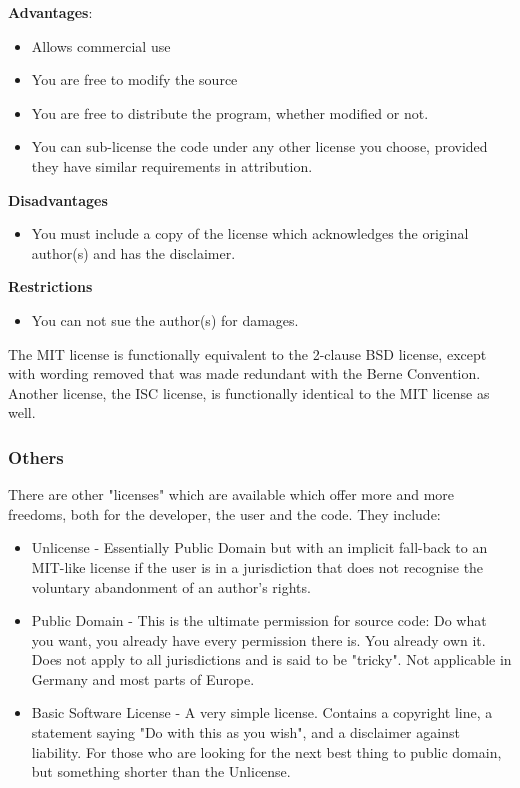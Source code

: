 \textbf{Advantages}:
\begin{itemize}
\item Allows commercial use
\item You are free to modify the source
\item You are free to distribute the program, whether modified or not.
\item You can sub-license the code under any other license you choose, provided they have similar requirements in attribution.
\end{itemize}
\textbf{Disadvantages}
\begin{itemize}
\item You must include a copy of the license which acknowledges the original author(s) and has the disclaimer.
\end{itemize}
\textbf{Restrictions}
\begin{itemize}
\item You can not sue the author(s) for damages.
\end{itemize}
The MIT license is functionally equivalent to the 2-clause BSD license, except with wording removed that was made redundant with the Berne Convention. Another license, the ISC license, is functionally identical to the MIT license as well.

\subsubsection{Others}
There are other "licenses" which are available which offer more and more freedoms, both for the developer, the user and the code. They include:
\begin{itemize}
\item Unlicense - Essentially Public Domain but with an implicit fall-back to an MIT-like license if the user is in a jurisdiction that does not recognise the voluntary abandonment of an author's rights.
\item Public Domain - This is the ultimate permission for source code: Do what you want, you already have every permission there is. You already own it. Does not apply to all jurisdictions and is said to be "tricky". Not applicable in Germany and most parts of Europe.
\item Basic Software License - A very simple license. Contains a copyright line, a statement saying "Do with this as you wish", and a disclaimer against liability. For those who are looking for the next best thing to public domain, but something shorter than the Unlicense.
\end{itemize}

